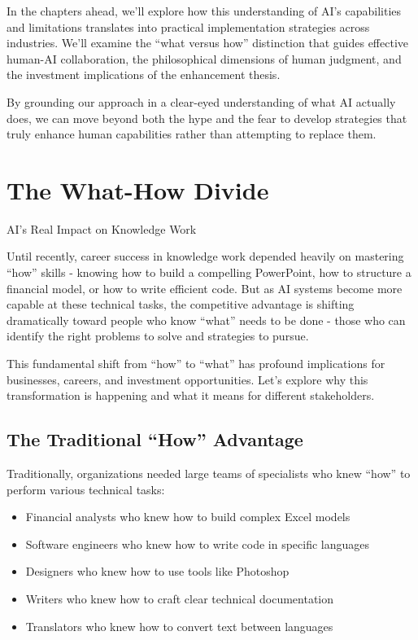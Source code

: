 \documentclass[
  Letterpaper,
]{scrbook}
\providecommand{\tightlist}{%
  \setlength{\itemsep}{0pt}\setlength{\parskip}{0pt}}\usepackage{longtable,booktabs,array}
\begin{document}
In the chapters ahead, we'll explore how this understanding of AI's
capabilities and limitations translates into practical implementation
strategies across industries. We'll examine the ``what versus how''
distinction that guides effective human-AI
collaboration, the
philosophical dimensions of human judgment, and the investment
implications of the enhancement thesis.

By grounding our approach in a clear-eyed understanding of what AI
actually does, we can move beyond both the hype and the fear to develop
strategies that truly enhance human capabilities rather than attempting
to replace them.


\chapter{The What-How Divide}\label{the-what-how-divide}

AI's Real Impact on Knowledge Work

\hfill\break

Until recently, career success in knowledge work depended heavily on
mastering ``how'' skills - knowing how to build a compelling PowerPoint,
how to structure a financial model, or how to write efficient code. But
as AI systems become more capable at these technical tasks, the
competitive advantage is shifting
dramatically toward people who know ``what'' needs to be done - those
who can identify the right problems to solve and strategies to pursue.

This fundamental shift from ``how'' to ``what'' has profound
implications for businesses, careers, and investment opportunities.
Let's explore why this transformation is happening and what it means for
different stakeholders.

\section{The Traditional ``How''
Advantage}\label{the-traditional-how-advantage}

Traditionally, organizations needed large teams of specialists who knew
``how'' to perform various technical tasks:

\begin{itemize}
\tightlist
\item
  Financial analysts who knew how to build complex Excel models
\item
  Software engineers who knew how to write code in specific languages
\item
  Designers who knew how to use tools like Photoshop
\item
  Writers who knew how to craft clear technical documentation
\item
  Translators who knew how to convert text between languages
\end{itemize}
\end{document}
